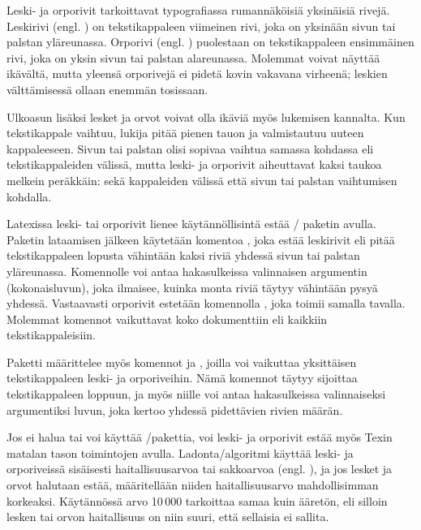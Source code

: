 Leski- ja orporivit tarkoittavat typografiassa rumannäköisiä yksinäisiä
rivejä. Leskirivi (engl. ) on tekstikappaleen viimeinen
rivi, joka on yksinään sivun tai palstan yläreunassa. Orporivi (engl.
) puolestaan on tekstikappaleen ensimmäinen rivi, joka
on yksin sivun tai palstan alareunassa. Molemmat voivat näyttää
ikävältä, mutta yleensä orporivejä ei pidetä kovin vakavana virheenä;
leskien välttämisessä ollaan enemmän tosissaan.

Ulkoasun lisäksi lesket ja orvot voivat olla ikäviä myös lukemisen
kannalta. Kun tekstikappale vaihtuu, lukija pitää pienen tauon ja
valmistautuu uuteen kappaleeseen. Sivun tai palstan olisi sopivaa
vaihtua samassa kohdassa eli tekstikappaleiden välissä, mutta leski- ja
orporivit aiheuttavat kaksi taukoa melkein peräkkäin: sekä kappaleiden
välissä että sivun tai palstan vaihtumisen kohdalla.

Latexissa leski- tai orporivit lienee käytännöllisintä estää
\-/ paketin avulla. Paketin lataamisen
jälkeen käytetään komentoa , joka estää leskirivit
eli pitää tekstikappaleen lopusta vähintään kaksi riviä yhdessä sivun
tai palstan yläreunassa. Komennolle voi antaa hakasulkeissa valinnaisen
argumentin (kokonaisluvun), joka ilmaisee, kuinka monta riviä täytyy
vähintään pysyä yhdessä. Vastaavasti orporivit estetään komennolla
, joka toimii samalla tavalla. Molemmat komennot
vaikuttavat koko dokumenttiin eli kaikkiin tekstikappaleisiin.

\begin{koodilohkosis}
\usepackage{nowidow}
\setnowidow   %
\setnoclub    %
\end{koodilohkosis}

Paketti  määrittelee myös komennot 
ja , joilla voi vaikuttaa yksittäisen tekstikappaleen
leski- ja orporiveihin. Nämä komennot täytyy sijoittaa tekstikappaleen
loppuun, ja myös niille voi antaa hakasulkeissa valinnaiseksi
argumentiksi luvun, joka kertoo yhdessä pidettävien rivien määrän.

Jos ei halua tai voi käyttää \-/pakettia, voi leski- ja
orporivit estää myös Texin matalan tason toimintojen avulla.
Ladonta\-/algoritmi käyttää leski- ja orporiveissä sisäisesti
haitallisuusarvoa tai sakkoarvoa (engl. ), ja jos
lesket ja orvot halutaan estää, määritellään niiden haitallisuusarvo
mahdollisimman korkeaksi. Käytännössä arvo 10\,000 tarkoittaa samaa kuin
ääretön, eli silloin lesken tai orvon haitallisuus on niin suuri, että
sellaisia ei sallita.

